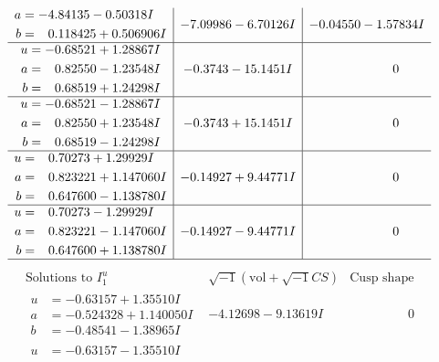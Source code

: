 \documentclass[1p]{elsarticle_modified}
\theoremstyle{definition}
\newcommand{\I}{\sqrt{-1}}
\begin{document}
$$\begin{array}{c|c|c}
\begin{aligned}
a &= -4.84135 - 0.50318 I \\
b &= \phantom{-}0.118425 + 0.506906 I\end{aligned}
 & -7.09986 - 6.70126 I & -0.04550 - 1.57834 I \\ \hline\begin{aligned}
u &= -0.68521 + 1.28867 I \\
a &= \phantom{-}0.82550 - 1.23548 I \\
b &= \phantom{-}0.68519 + 1.24298 I\end{aligned}
 & -0.3743 - 15.1451 I & \phantom{-0.000000 } 0 \\ \hline\begin{aligned}
u &= -0.68521 - 1.28867 I \\
a &= \phantom{-}0.82550 + 1.23548 I \\
b &= \phantom{-}0.68519 - 1.24298 I\end{aligned}
 & -0.3743 + 15.1451 I & \phantom{-0.000000 } 0 \\ \hline\begin{aligned}
u &= \phantom{-}0.70273 + 1.29929 I \\
a &= \phantom{-}0.823221 + 1.147060 I \\
b &= \phantom{-}0.647600 - 1.138780 I\end{aligned}
 & -0.14927 + 9.44771 I & \phantom{-0.000000 } 0 \\ \hline\begin{aligned}
u &= \phantom{-}0.70273 - 1.29929 I \\
a &= \phantom{-}0.823221 - 1.147060 I \\
b &= \phantom{-}0.647600 + 1.138780 I\end{aligned}
 & -0.14927 - 9.44771 I & \phantom{-0.000000 } 0\\
 \hline 
 \end{array}$$\newpage$$\begin{array}{c|c|c}  
\text{Solutions to }I^u_{1}& \I (\text{vol} + \sqrt{-1}CS) & \text{Cusp shape}\\
 \hline 
\begin{aligned}
u &= -0.63157 + 1.35510 I \\
a &= -0.524328 + 1.140050 I \\
b &= -0.48541 - 1.38965 I\end{aligned}
 & -4.12698 - 9.13619 I & \phantom{-0.000000 } 0 \\ \hline\begin{aligned}
u &= -0.63157 - 1.35510 I \\

\end{aligned}
\end{array}$$
\end{document}
